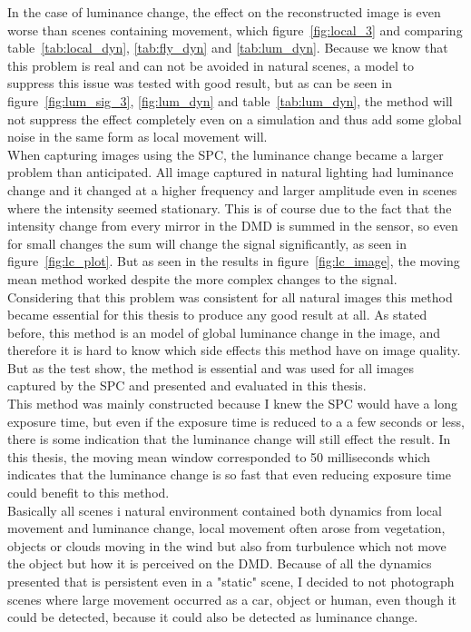 In the case of luminance change, the effect on the reconstructed image is even worse than scenes containing movement, which figure~\ref{fig:local_3} and comparing table~\ref{tab:local_dyn}, \ref{tab:fly_dyn} and \ref{tab:lum_dyn}. Because we know that this problem is real and can not be avoided in natural scenes, a model to suppress this issue was tested with good result, but as can be seen in figure~\ref{fig:lum_sig_3}, \ref{fig:lum_dyn} and table~\ref{tab:lum_dyn}, the method will not suppress the effect completely even on a simulation and thus add some global noise in the same form as local movement will.\\[0.1in]

When capturing images using the SPC, the luminance change became a larger problem than anticipated. All image captured in natural lighting had luminance change and it changed at a higher frequency and larger amplitude even in scenes where the intensity seemed stationary. This is of course due to the fact that the intensity change from every mirror in the DMD is summed in the sensor, so even for small changes the sum will change the signal significantly, as seen in figure~\ref{fig:lc_plot}. But as seen in the results in figure~\ref{fig:lc_image}, the moving mean method worked despite the more complex changes to the signal. Considering that this problem was consistent for all natural images this method became essential for this thesis to produce any good result at all. As stated before, this method is an model of global luminance change in the image, and therefore it is hard to know which side effects this method have on image quality. But as the test show, the method is essential and was used for all images captured by the SPC and presented and evaluated in this thesis.\\[0.1in]

This method was mainly constructed because I knew the SPC would have a long exposure time, but even if the exposure time is reduced to a a few seconds or less, there is some indication that the luminance change will still effect the result. In this thesis, the moving mean window corresponded to 50 milliseconds which indicates that the luminance change is so fast that even reducing exposure time could benefit to this method.\\[0.1in]


Basically all scenes i natural environment contained both dynamics from local movement and luminance change, local movement often arose from vegetation, objects or clouds moving in the wind but also from turbulence which not move the object but how it is perceived on the DMD. Because of all the dynamics presented that is persistent even in a "static" scene, I decided to not photograph scenes where large movement occurred as a car, object or human, even though it could be detected, because it could also be detected as luminance change.\\[0.1in]

